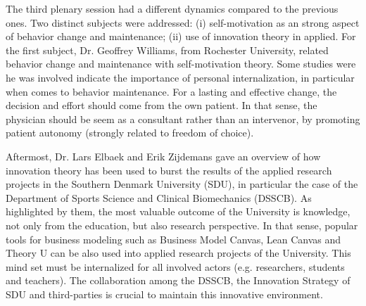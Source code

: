 The third plenary session had a different dynamics compared to the previous ones. 
Two distinct subjects were addressed: (i) self-motivation as an strong aspect of behavior change and maintenance; (ii) use of innovation theory in applied. 
For the first subject, Dr. Geoffrey Williams, from Rochester University, related behavior change and maintenance with self-motivation theory. 
Some studies were he was involved indicate the importance of personal internalization, in particular when comes to behavior maintenance.
For a lasting and effective change, the decision and effort should come from the own patient. 
In that sense, the physician should be seem as a consultant rather than an intervenor, by promoting patient autonomy (strongly related to freedom of choice).

Aftermost, Dr. Lars Elbaek and Erik Zijdemans gave an overview of how innovation theory has been used to burst the results of the applied research projects in the Southern Denmark University (SDU), in particular the case of the Department of Sports Science and Clinical Biomechanics (DSSCB). 
As highlighted by them, the most valuable outcome of the University is knowledge, not only from the education, but also research perspective.
In that sense, popular tools for business modeling such as Business Model Canvas, Lean Canvas and Theory U can be also used into applied research projects of the University.
This mind set must be internalized for all involved actors (e.g. researchers, students and teachers). 
The collaboration among the DSSCB, the Innovation Strategy of SDU and third-parties is crucial to maintain this innovative environment.




